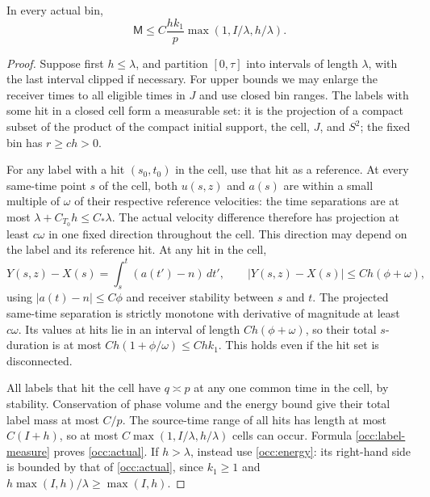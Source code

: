 \begin{lemma}\label{occ:cell-lemma}
In every actual bin,
\begin{equation}\label{occ:actual}
 \mathsf M\leq C\frac{hk_1}{p}
                       \max(1,I/\lambda,h/\lambda).
\end{equation}
\end{lemma}

\begin{proof}
Suppose first $h\leq\lambda$, and partition $[0,\tau]$ into intervals
of length $\lambda$, with the last interval clipped if necessary.
For upper bounds we may enlarge the receiver times to all eligible times
in $J$ and use closed bin ranges. The labels with some hit in a closed
cell form a measurable set: it is the projection of a compact subset of
the product of the compact initial support, the cell, $J$, and $S^2$;
the fixed bin has $r\geq ch>0$.

For any label with a hit $(s_0,t_0)$ in the cell, use that hit as a
reference. At every same-time point $s$ of the cell, both $u(s,z)$ and
$a(s)$ are within a small multiple of $\omega$ of their respective
reference velocities: the time separations are at most
$\lambda+C_{T_0}h\leq C_*\lambda$.
The actual velocity difference therefore has projection at least
$c\omega$ in one fixed direction throughout the cell. This direction
may depend on the label and its reference hit.
At any hit in the cell,
\[
 Y(s,z)-X(s)=\int_s^t(a(t')-n)\,dt',
 \qquad |Y(s,z)-X(s)|\leq Ch(\phi+\omega),
\]
using $|a(t)-n|\leq C\phi$ and receiver stability between $s$ and $t$.
The projected same-time separation is strictly monotone with derivative
of magnitude at least $c\omega$. Its values at hits lie in an interval
of length $Ch(\phi+\omega)$, so their total $s$-duration is at most
$Ch(1+\phi/\omega)\leq Chk_1$. This holds even if the hit set is
disconnected.

All labels that hit the cell have $q\asymp p$ at any one common time in
the cell, by stability. Conservation of phase volume and the energy
bound give their total label mass at most $C/p$. The source-time range
of all hits has length at most $C(I+h)$, so at most
$C\max(1,I/\lambda,h/\lambda)$ cells can occur. Formula
\eqref{occ:label-measure} proves \eqref{occ:actual}.
If $h>\lambda$, instead use \eqref{occ:energy}: its right-hand side is
bounded by that of \eqref{occ:actual}, since $k_1\geq1$ and
$h\max(I,h)/\lambda\geq\max(I,h)$.
\end{proof}

